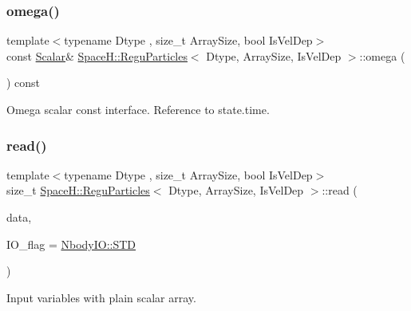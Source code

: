 \subsubsection{\texorpdfstring{omega()}{omega()}}
{\footnotesize\ttfamily template$<$typename Dtype , size\+\_\+t Array\+Size, bool Is\+Vel\+Dep$>$ \\
const \mbox{\hyperlink{class_space_h_1_1_vel_indep_particles_aeb47d8131b30ed790320ff634f0d6af1}{Scalar}}\& \mbox{\hyperlink{class_space_h_1_1_regu_particles}{Space\+H\+::\+Regu\+Particles}}$<$ Dtype, Array\+Size, Is\+Vel\+Dep $>$\+::omega (\begin{DoxyParamCaption}{ }\end{DoxyParamCaption}) const\hspace{0.3cm}{\ttfamily [inline]}}



Omega scalar const interface. Reference to state.\+time. 

\mbox{\label{class_space_h_1_1_regu_particles_a639789e55a57427963b49a95c4e66c86}} 
\subsubsection{\texorpdfstring{read()}{read()}}
{\footnotesize\ttfamily template$<$typename Dtype , size\+\_\+t Array\+Size, bool Is\+Vel\+Dep$>$ \\
size\+\_\+t \mbox{\hyperlink{class_space_h_1_1_regu_particles}{Space\+H\+::\+Regu\+Particles}}$<$ Dtype, Array\+Size, Is\+Vel\+Dep $>$\+::read (\begin{DoxyParamCaption}\item[{const \mbox{\hyperlink{class_space_h_1_1_vel_indep_particles_abca40159a816385790d5a6fd19c1dc6d}{Scalar\+Buffer}} \&}]{data,  }\item[{const \mbox{\hyperlink{namespace_space_h_a296a8bae763a754564bfdce216e31b59}{Nbody\+IO}}}]{I\+O\+\_\+flag = {\ttfamily \mbox{\hyperlink{namespace_space_h_a296a8bae763a754564bfdce216e31b59ac6ce23be5d350ce18a665427d2d950f7}{Nbody\+I\+O\+::\+S\+TD}}} }\end{DoxyParamCaption})\hspace{0.3cm}{\ttfamily [inline]}}



Input variables with plain scalar array. 

